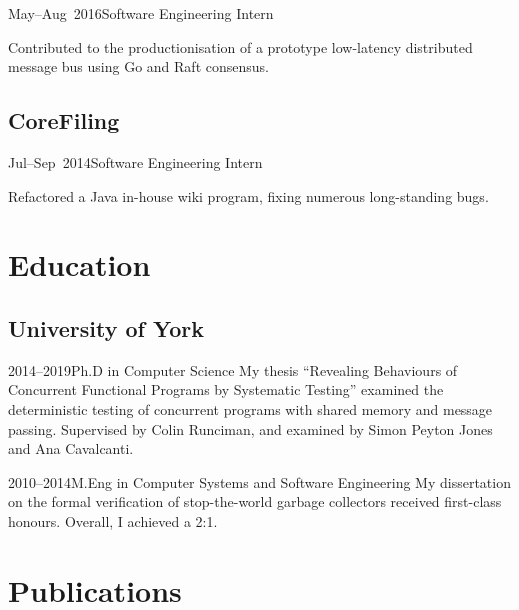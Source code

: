 \documentclass[a4paper]{barrucadu-cv}
\newcommand{\range}[2]{#1–#2}
\begin{document}
\begin{cventry}{\range{May}{Aug}~2016}{Software Engineering Intern}
  \begin{tightitemize}
  \item Contributed to the productionisation of a prototype low-latency distributed message bus using Go and Raft consensus.
  \end{tightitemize}
\end{cventry}

\subsection{CoreFiling}

\begin{cventry}{\range{Jul}{Sep}~2014}{Software Engineering Intern}
  \begin{tightitemize}
  \item Refactored a Java in-house wiki program, fixing numerous long-standing bugs.
  \end{tightitemize}
\end{cventry}

\section{Education}

\subsection{University of York}

\begin{cventry}{\range{2014}{2019}}{Ph.D in Computer Science}
  My thesis ``Revealing Behaviours of Concurrent Functional Programs
  by Systematic Testing'' examined the deterministic testing of
  concurrent programs with shared memory and message passing.
  Supervised by Colin Runciman, and examined by Simon Peyton Jones and
  Ana Cavalcanti.
\end{cventry}

\begin{cventry}{\range{2010}{2014}}{M.Eng in Computer Systems and Software Engineering}
  My dissertation on the formal verification of stop-the-world garbage
  collectors received first-class honours.  Overall, I achieved a 2:1.
\end{cventry}

\section{Publications}
\end{document}
